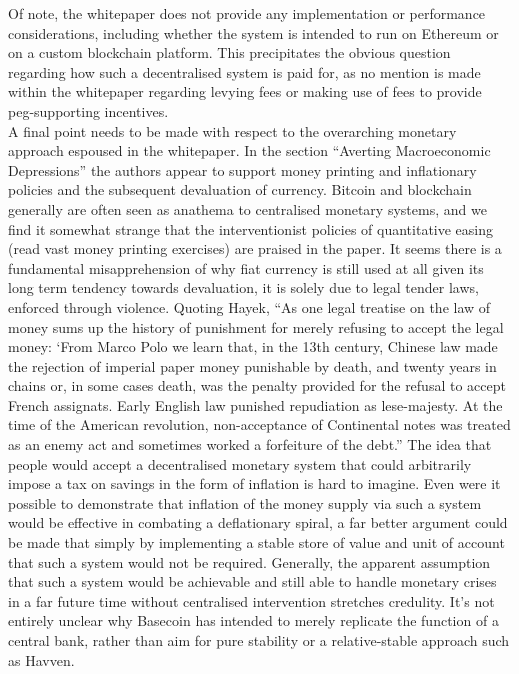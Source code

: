 \documentclass{article}
\begin{document}
\noindent Of note, the whitepaper does not provide any implementation or performance considerations, including whether the system is intended to run on Ethereum or on a custom blockchain platform. This precipitates the obvious question regarding how such a decentralised system is paid for, as no mention is made within the whitepaper regarding levying fees or making use of fees to provide peg-supporting incentives. \\

\noindent A final point needs to be made with respect to the overarching monetary approach espoused in the whitepaper. In the section “Averting Macroeconomic Depressions” the authors appear to support money printing and inflationary policies and the subsequent devaluation of currency. Bitcoin and blockchain generally are often seen as anathema to centralised monetary systems, and we find it somewhat strange that the interventionist policies of quantitative easing (read vast money printing exercises) are praised in the paper. It seems there is a fundamental misapprehension of why fiat currency is still used at all given its long term tendency towards devaluation, it is solely due to legal tender laws, enforced through violence.  Quoting Hayek, “As one legal treatise on the law of money sums up the history of punishment for merely refusing to accept the legal money: ‘From Marco Polo we learn that, in the 13th century, Chinese law made the rejection of imperial paper money punishable by death, and twenty years in chains or, in some cases death, was the penalty provided for the refusal to accept French assignats. Early English law punished repudiation as lese-majesty. At the time of the American revolution, non-acceptance of Continental notes was treated as an enemy act and sometimes worked a forfeiture of the debt.” The idea that people would accept a decentralised monetary system that could arbitrarily impose a tax on savings in the form of inflation is hard to imagine. Even were it possible to demonstrate that inflation of the money supply via such a system would be effective in combating a deflationary spiral, a far better argument could be made that simply by implementing a stable store of value and unit of account that such a system would not be required. Generally, the apparent assumption that such a system would be achievable and still able to handle monetary crises in a far future time without centralised intervention stretches credulity. It's not entirely unclear why Basecoin has intended to merely replicate the function of a central bank, rather than aim for pure stability or a relative-stable approach such as Havven. \\
\end{document}
